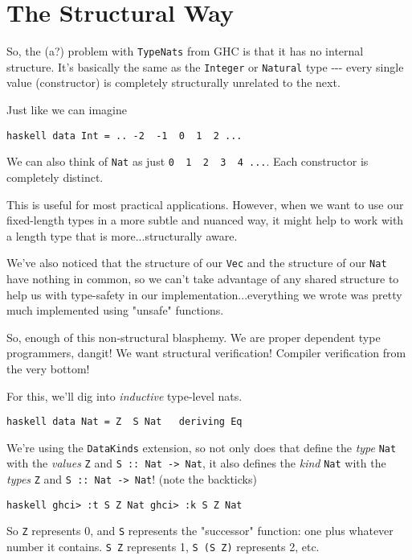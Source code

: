 \documentclass[]{article}
\begin{document}
\section{The Structural Way}

So, the (a?) problem with \texttt{TypeNats} from GHC is that it has no internal
structure. It's basically the same as the \texttt{Integer} or \texttt{Natural}
type -\/-\/- every single value (constructor) is completely structurally
unrelated to the next.

Just like we can imagine

\texttt{haskell\ data\ Int\ =\ ..\ -2\ \textbar{}\ -1\ \textbar{}\ 0\ \textbar{}\ 1\ \textbar{}\ 2\ ...}

We can also think of \texttt{Nat} as just
\texttt{0\ \textbar{}\ 1\ \textbar{}\ 2\ \textbar{}\ 3\ \textbar{}\ 4\ ...}.
Each constructor is completely distinct.

This is useful for most practical applications. However, when we want to use our
fixed-length types in a more subtle and nuanced way, it might help to work with
a length type that is more...structurally aware.

We've also noticed that the structure of our \texttt{Vec} and the structure of
our \texttt{Nat} have nothing in common, so we can't take advantage of any
shared structure to help us with type-safety in our implementation...everything
we wrote was pretty much implemented using "unsafe" functions.

So, enough of this non-structural blasphemy. We are proper dependent type
programmers, dangit! We want structural verification! Compiler verification from
the very bottom!

For this, we'll dig into \emph{inductive} type-level nats.

\texttt{haskell\ data\ Nat\ =\ Z\ \textbar{}\ S\ Nat\ \ \ deriving\ Eq}

We're using the \texttt{DataKinds} extension, so not only does that define the
\emph{type} \texttt{Nat} with the \emph{values} \texttt{Z} and
\texttt{S\ ::\ Nat\ -\textgreater{}\ Nat}, it also defines the \emph{kind}
\texttt{Nat} with the \emph{types} \texttt{\textquotesingle{}Z} and
\texttt{\textquotesingle{}S\ ::\ Nat\ -\textgreater{}\ Nat}! (note the
backticks)

\texttt{haskell\ ghci\textgreater{}\ :t\ S\ Z\ Nat\ ghci\textgreater{}\ :k\ \textquotesingle{}S\ \textquotesingle{}Z\ Nat}

So \texttt{\textquotesingle{}Z} represents 0, and \texttt{\textquotesingle{}S}
represents the "successor" function: one plus whatever number it contains.
\texttt{\textquotesingle{}S\ \textquotesingle{}Z} represents 1,
\texttt{\textquotesingle{}S\ (\textquotesingle{}S\ \textquotesingle{}Z)}
represents 2, etc.
\end{document}
